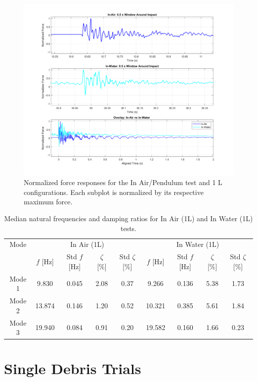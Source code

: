 \documentclass{article}
\begin{document}
{\begin{figure}[ht]
    \centering
    \includegraphics[width=\linewidth]{figures/plot_normalized_forces_in_air_vs_in_water_overlay.png}
    \caption{Normalized force responses for the In Air/Pendulum test and 1 L configurations. Each subplot is normalized by its respective maximum force.}
    \label{fig:normalized_forces_structure}
\end{figure}


\begin{table}[ht]
\centering
\small
\begin{tabular}{c c c c c c c c c}
\hline
Mode & \multicolumn{4}{c}{In Air (1L)} & \multicolumn{4}{c}{In Water (1L)} \\
\cline{2-9}
 & $f$ [Hz] & Std $f$ [Hz] & $\zeta$ [\%] & Std $\zeta$ [\%] & $f$ [Hz] & Std $f$ [Hz] & $\zeta$ [\%] & Std $\zeta$ [\%] \\
\hline
Mode 1 & 9.830 & 0.045 & 2.08 & 0.37 & 9.266 & 0.136 & 5.38 & 1.73 \\
Mode 2 & 13.874 & 0.146 & 1.20 & 0.52 & 10.321 & 0.385 & 5.61 & 1.84 \\
Mode 3 & 19.940 & 0.084 & 0.91 & 0.20 & 19.582 & 0.160 & 1.66 & 0.23 \\
\hline
\end{tabular}

\caption{Median natural frequencies and damping ratios for In Air (1L) and In Water (1L) tests.}
\label{tab:mode_summary}
\end{table}
\section{Single Debris Trials} 

}
\end{document}
